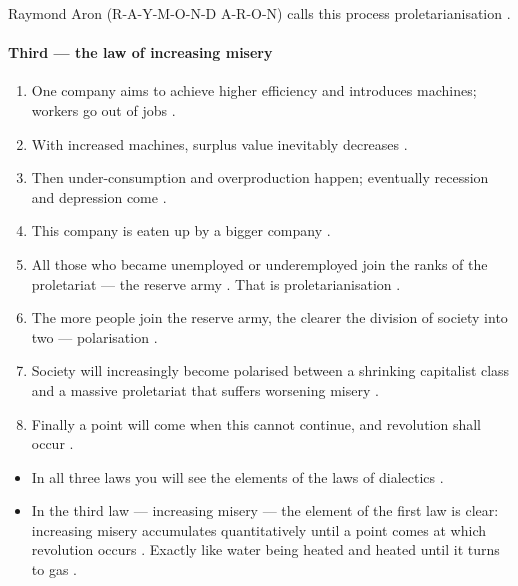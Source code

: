 \begin{KeyConcept}
Raymond Aron (R-A-Y-M-O-N-D A-R-O-N) calls this process proletarianisation .
\end{KeyConcept}

\paragraph{Third --- the law of increasing misery}
\begin{enumerate}
    \item One company aims to achieve higher efficiency and introduces machines; workers go out of jobs .
    \item With increased machines, surplus value inevitably decreases .
    \item Then under-consumption and overproduction happen; eventually recession and depression come .
    \item This company is eaten up by a bigger company .
    \item All those who became unemployed or underemployed join the ranks of the proletariat --- the reserve army . That is proletarianisation .
    \item The more people join the reserve army, the clearer the division of society into two --- polarisation .
    \item Society will increasingly become polarised between a shrinking capitalist class and a massive proletariat that suffers worsening misery .
    \item Finally a point will come when this cannot continue, and revolution shall occur .
\end{enumerate}

\begin{CriticalPoint}
\begin{itemize}
    \item In all three laws you will see the elements of the laws of dialectics .
    \item In the third law --- increasing misery --- the element of the first law is clear: increasing misery accumulates quantitatively until a point comes at which revolution occurs . Exactly like water being heated and heated until it turns to gas .
\end{itemize}
\end{CriticalPoint}


